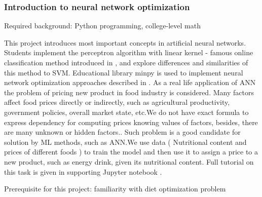 \documentclass{article} %
\begin{document}
  \subsubsection{Introduction to neural network optimization}



Required background: Python programming, college-level math

This project introduces most important concepts in artificial neural networks.
Students implement the perceptron algorithm with linear kernel - famous online classification method introduced in  \cite{ABR}, and explore differences and similarities of this method to SVM. Educational library minpy  \cite{MP} is used to implement neural network optimization approaches described in \cite{YZWQ,YZWQ1,KP1}.
As a real life application of ANN the problem of pricing new product in food industry is considered. Many factors affect food prices directly or indirectly, such as agricultural productivity, government policies, overall market state, etc.We do not have exact formula to express dependency for computing prices knowing values of factors, besides, there are many unknown or hidden factors.. Such problem is a good candidate for solution by ML methods, such as ANN.We use data ( Nutritional content and prices of different foods ) to train the model and then use it to assign a price to a new product, such as energy drink, given its nutritional content. Full tutorial on this task is given in supporting Jupyter notebook \cite{anndemo}.

Prerequisite for this project: familiarity with diet optimization problem
\end{document}
